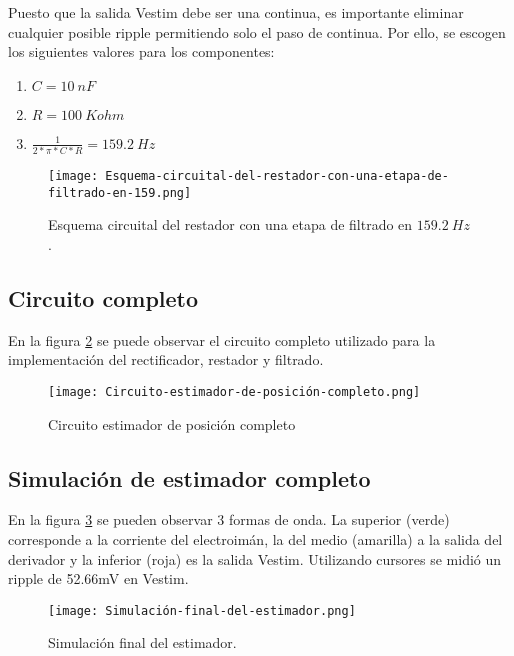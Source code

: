 \noindent Puesto que la salida Vestim debe ser una continua, es importante eliminar cualquier posible ripple permitiendo solo el paso de continua. Por ello, se escogen los siguientes valores para los componentes:

\begin{enumerate}
	\item  $C=10\ nF$
	
	\item  $R=100\ Kohm$
	
	\item  $\frac{1}{2*\pi *C*R}=159.2\ Hz$
\end{enumerate}

\begin{figure}[H]
	\centering
	\texttt{[image: Esquema-circuital-del-restador-con-una-etapa-de-filtrado-en-159.png]}
	\caption{Esquema circuital del restador con una etapa de filtrado en $159.2\ Hz$.}
	\label{fig:img_Esquema-circuital-del-restador-con-una-etapa-de-filtrado-en-159}
\end{figure}

\subsection{Circuito completo}

\noindent En la figura \ref{fig:img_Circuito_estimador_de_posición_completo} se puede observar el circuito completo utilizado para la implementaci\'{o}n del rectificador, restador y filtrado.

\begin{figure}[H]
	\centering
	\texttt{[image: Circuito-estimador-de-posición-completo.png]}
	\caption{Circuito estimador de posición completo}
	\label{fig:img_Circuito_estimador_de_posición_completo}
\end{figure}

\subsection{Simulaci\'{o}n de estimador completo}

\noindent En la figura \ref{fig:img_Simulación_final_del_estimado} se pueden observar 3 formas de onda. La superior (verde) corresponde a la corriente del electroim\'{a}n, la del medio (amarilla) a la salida del derivador y la inferior (roja) es la salida Vestim. Utilizando cursores se midi\'{o} un ripple de 52.66mV en Vestim.

\begin{figure}[H]
	\centering
	\texttt{[image: Simulación-final-del-estimador.png]}
	\caption{Simulación final del estimador.}
	\label{fig:img_Simulación_final_del_estimado}
\end{figure}

